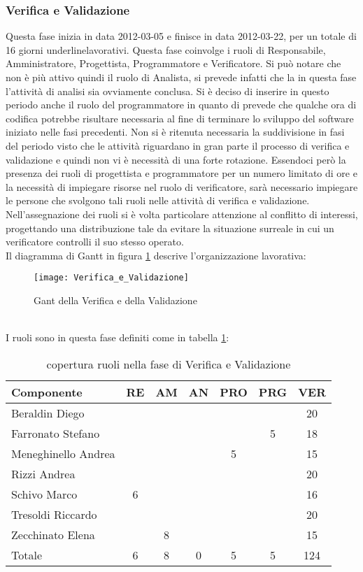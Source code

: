 \subsubsection{Verifica e Validazione}
Questa fase inizia in data 2012-03-05 e finisce in data 2012-03-22, per un totale di 16 giorni underline{lavorativi}.
Questa fase coinvolge i ruoli di Responsabile, Amministratore, Progettista, Programmatore e Verificatore. Si può notare che non è più attivo quindi il ruolo di Analista, si prevede infatti che la in questa fase l’attività di analisi sia ovviamente conclusa.
Si è deciso di inserire  in questo periodo anche il ruolo del programmatore in quanto di prevede che qualche ora di codifica potrebbe risultare necessaria al fine di terminare lo sviluppo del software iniziato nelle fasi precedenti.
Non si è ritenuta necessaria la suddivisione in fasi del periodo visto che le attività riguardano in gran parte il processo di verifica e validazione e quindi non vi è necessità di una forte rotazione.
Essendoci però la presenza dei ruoli di progettista e programmatore per un numero limitato di ore e la necessità di impiegare risorse nel ruolo di verificatore, sarà necessario impiegare le persone che svolgono tali ruoli nelle attività di verifica e validazione.  
Nell’assegnazione dei ruoli si è volta particolare attenzione al conflitto di interessi,  progettando una distribuzione tale da evitare la situazione surreale in cui un verificatore controlli il suo stesso operato.\\
Il diagramma di Gantt in figura \ref{fig:gantvv} descrive l'organizzazione lavorativa:\\
\begin{figure}[h!]
  \texttt{[image: Verifica\_e\_Validazione]}
\caption{Gant della Verifica e della Validazione}\label{fig:gantvv}
\end{figure}\\
I ruoli sono in questa fase definiti come in tabella \ref{tab:ruolivv}:\\
\begin{table}[h!]
\centering
\begin{tabular}{|l|c|c|c|c|c|c|}
\hline
Componente& RE& AM& AN& PRO& PRG& VER\\
\hline
Beraldin Diego & & & & & & 20\\
Farronato Stefano & & & & & 5& 18\\
Meneghinello Andrea & & & & 5& & 15\\
Rizzi Andrea & & & & & & 20\\
Schivo Marco & 6& & & & & 16\\
Tresoldi Riccardo & & & & & & 20\\
Zecchinato Elena & & 8& & & & 15\\
\hline
Totale & 6& 8& 0& 5& 5& 124\\
\hline
\end{tabular}
\caption{copertura ruoli nella fase di Verifica e Validazione}\label{tab:ruolivv}
\end{table}
